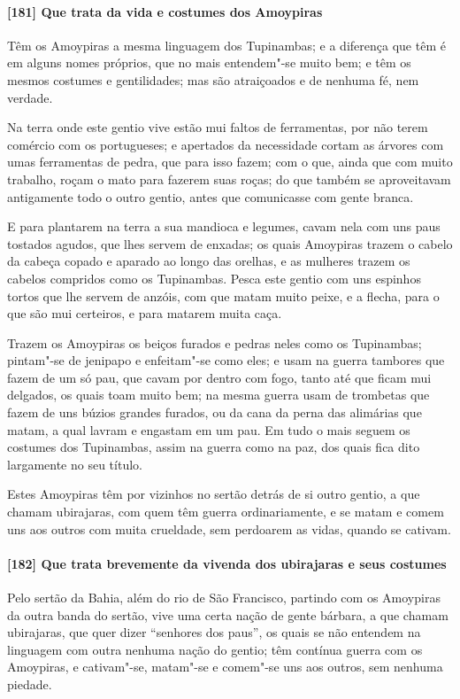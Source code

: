 \begin{linenumbers}
\paragraph{[181] Que trata da vida e costumes dos Amoypiras}\quad
Têm os Amoypiras a mesma linguagem dos Tupinambas; e a diferença que têm é em alguns nomes
próprios, que no mais entendem"-se muito bem; e têm os mesmos costumes e gentilidades; mas
são atraiçoados e de nenhuma fé, nem verdade.

Na terra onde este gentio vive estão mui faltos de ferramentas, por não terem comércio com
os portugueses; e apertados da necessidade cortam as árvores com umas ferramentas de
pedra, que para isso fazem; com o que, ainda que com muito trabalho, roçam o mato para
fazerem suas roças; do que também se aproveitavam antigamente todo o outro gentio, antes
que comunicasse com gente branca.

E para plantarem na terra a sua mandioca e legumes, cavam nela com uns paus tostados
agudos, que lhes servem de enxadas; os quais Amoypiras trazem o cabelo da cabeça copado e
aparado ao longo das orelhas, e as mulheres trazem os cabelos compridos como os
Tupinambas. Pesca este gentio com uns espinhos tortos que lhe servem de anzóis, com que
matam muito peixe, e a flecha, para o que são mui certeiros, e para matarem muita caça.

Trazem os Amoypiras os beiços furados e pedras neles como os Tupinambas; pintam"-se de
jenipapo e enfeitam"-se como eles; e usam na guerra tambores que fazem de um só pau, que
cavam por dentro com fogo, tanto até que ficam mui delgados, os quais toam muito bem; na
mesma guerra usam de trombetas que fazem de uns búzios grandes furados, ou da cana da
perna das alimárias que matam, a qual lavram e engastam em um pau. Em tudo o mais seguem
os costumes dos Tupinambas, assim na guerra como na paz, dos quais fica dito largamente no
seu título.

Estes Amoypiras têm por vizinhos no sertão detrás de si outro gentio, a que chamam
ubirajaras, com quem têm guerra ordinariamente, e se matam e comem uns aos outros com
muita crueldade, sem perdoarem as vidas, quando se cativam.

\paragraph{[182] Que trata brevemente da vivenda dos ubirajaras e seus costumes}\quad
Pelo sertão da Bahia, além do rio de São Francisco, partindo com os Amoypiras da outra
banda do sertão, vive uma certa nação de gente bárbara, a que chamam ubirajaras, que quer
dizer ``senhores dos paus'', os quais se não entendem na linguagem com outra nenhuma nação
do gentio; têm contínua guerra com os Amoypiras, e cativam"-se, matam"-se e comem"-se uns aos
outros, sem nenhuma piedade.


\end{linenumbers}

